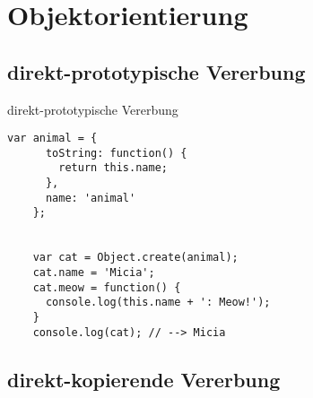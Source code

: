 \section{Objektorientierung}

\newcommand{\hla}[1]{\textcolor{stringcolor}{#1}}
\newcommand{\hlb}[1]{\textcolor{keywordcolor}{#1}}


\subsection{direkt-prototypische Vererbung}

\begin{frame}[fragile]{direkt-prototypische Vererbung}
  \begin{lstlisting}[gobble=4]
    var animal = {
      toString: function() {
        return this.name;
      },
      name: 'animal'
    };
    
    
    var cat = Object.create(animal);
    cat.name = 'Micia';
    cat.meow = function() {
      console.log(this.name + ': Meow!');
    }
    console.log(cat); // --> Micia
  \end{lstlisting}
\end{frame}

\subsection{direkt-kopierende Vererbung}

